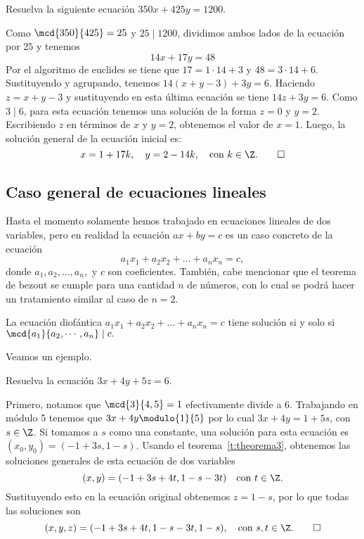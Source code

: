 \begin{example}
    Resuelva la siguiente ecuación $350x + 425y = 1200$.
\end{example}
\begin{solution}
    Como $\mcd{350}{425} = 25$ y $25 \mid 1200$, dividimos ambos lados de la ecuación por $25$ y tenemos
    \[
        14x+17y=48
    \]
    Por el algoritmo de euclides se tiene que $17 = 1\cdot14+3$ y $48=3\cdot14+6$.
    Sustituyendo y agrupando, tenemos $14(x+y-3)+3y=6.$
    Haciendo $z=x+y-3$ y sustituyendo en esta última ecuación se tiene $14z+3y=6.$
    Como $3\mid6$, para esta ecuación tenemos una solución de la forma $z=0$ y $y=2$.
    Escribiendo $z$ en términos de $x$ y $y=2$, obtenemos el valor de $x=1$.
    Luego, la solución general de la ecuación inicial es:
    \[
        x=1+17k, \quad y=2-14k, \quad\text{con}\ k \in \Z. \qedhere
    \]
\end{solution}



\subsection{Caso general de ecuaciones lineales}

Hasta el momento solamente hemos trabajado en ecuaciones lineales de dos variables, pero en realidad la ecuación
$ax + by = c$ es un caso concreto de la ecuación
\[
    a_1 x_1 + a_2 x_2 + \ldots + a_n x_n = c,
\]
donde $a_1, a_2, \dots, a_n,$ y $c$ son coeficientes.
También, cabe mencionar que el teorema de bezout se cumple para una cantidad $n$ de números, con lo cual
se podrá hacer un tratamiento similar al caso de $n = 2$.

\begin{theorem.box}{}{}
    La ecuación diofántica $a_1 x_1 + a_2 x_2 + \ldots + a_n x_n = c$ tiene solución si y solo si $\mcd {a_1}{a_2,\cdots,a_n} \mid c.$
\end{theorem.box}

Veamos un ejemplo.

\begin{example}
    Resuelva la ecuación $3x + 4y + 5z = 6$.
\end{example}
\begin{solution}
    Primero, notamos que $\mcd{3}{4,5} = 1$ efectivamente divide a 6.
    Trabajando en módulo 5 tenemos que $3x + 4y\modulo{1}{5}$ por lo cual $3x + 4y = 1 + 5s$, con $s \in \Z$.
    Si tomamos a $s$ como una constante, una solución para esta ecuación es $(x_0, y_0) = (-1 + 3s, 1 - s)$.
    Usando el teorema~\ref{t:theorema3}, obtenemos las soluciones generales de esta ecuación de dos variables
    \[
        (x,y) = (-1+3s+4t, 1-s-3t)\quad\text{con}\ t \in \Z.
    \]
    Sustituyendo esto en la ecuación original obtenemos $z = 1 - s$, por lo que todas las soluciones son
    \[
        (x,y,z)=(-1+3s+4t,1-s-3t,1-s), \quad \text{con}\ s,t \in \Z.\qedhere
    \]
\end{solution}

